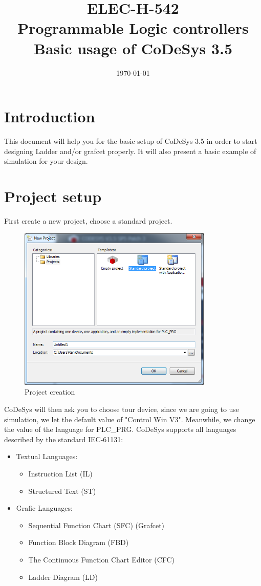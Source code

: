 \documentclass[10pt,a4paper]{article}
\date{\vspace{-1cm}\mydate\today}
\title{\vspace{-2cm} ELEC-H-542 \\ Programmable Logic controllers \\
                                Basic usage of CoDeSys 3.5}
\begin{document}
\maketitle

\section{Introduction}
This document will help you for the basic setup of CoDeSys 3.5 in order to start designing Ladder and/or grafcet properly. It will also present a basic example of simulation for your design.

\section{Project setup}
First create a new project, choose a standard project.

\begin{figure}[h!]
	\begin{center}
		\includegraphics[width=350px]{img2.PNG}
	\end{center}
\caption{Project creation}
\label{fig:creation}
\end{figure}

CoDeSys will then ask you to choose tour device, since we are going to use simulation, we let the default value of "Control Win V3".
Meanwhile, we change the value of the language for PLC\_PRG.
CoDeSys supports all languages described by the standard IEC-61131:

\begin{itemize}
\item Textual Languages:
\begin{itemize}
\item Instruction List (IL)
\item Structured Text (ST)
\end{itemize}
\item Grafic Languages:
\begin{itemize}
\item Sequential Function Chart (SFC) (Grafcet)
\item Function Block Diagram (FBD)
\item The Continuous Function Chart Editor (CFC)
\item Ladder Diagram (LD)
\end{itemize}
\end{itemize}
\end{document}

